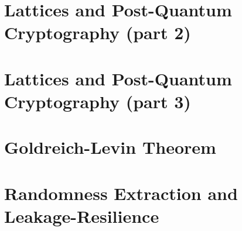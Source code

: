 \documentclass{llncs}
\begin{document}
\section{Lattices and Post-Quantum Cryptography (part 2)}

\section{Lattices and Post-Quantum Cryptography (part 3)}

\section{Goldreich-Levin Theorem}

\section{Randomness Extraction and Leakage-Resilience}


\printbibliography %
\end{document}
